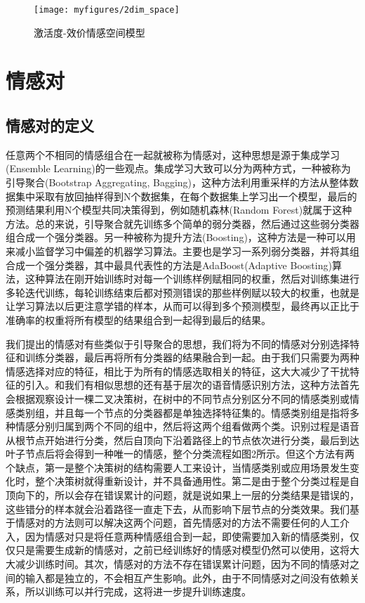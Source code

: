 \begin{figure}[H] %
    \centering
    \texttt{[image: myfigures/2dim\_space]}
    \caption{激活度-效价情感空间模型}
    \label{fig:xfig1}
\end{figure}

\section{情感对}
\label{sec:emo_pair}

\subsection{情感对的定义}
\label{ssec:emo_pair_def}
任意两个不相同的情感组合在一起就被称为情感对，这种思想是源于集成学习(Ensemble Learning)的一些观点。集成学习大致可以分为两种方式，一种被称为引导聚合(Bootstrap Aggregating, Bagging)，这种方法利用重采样的方法从整体数据集中采取有放回抽样得到N个数据集，在每个数据集上学习出一个模型，最后的预测结果利用N个模型共同决策得到，例如随机森林(Random Forest)就属于这种方法。总的来说，引导聚合就先训练多个简单的弱分类器，然后通过这些弱分类器组合成一个强分类器。另一种被称为提升方法(Boosting)，这种方法是一种可以用来减小监督学习中偏差的机器学习算法。主要也是学习一系列弱分类器，并将其组合成一个强分类器，其中最具代表性的方法是AdaBoost(Adaptive Boosting)算法，这种算法在刚开始训练时对每一个训练样例赋相同的权重，然后对训练集进行多轮迭代训练，每轮训练结束后都对预测错误的那些样例赋以较大的权重，也就是让学习算法以后更注意学错的样本，从而可以得到多个预测模型，最终再以正比于准确率的权重将所有模型的结果组合到一起得到最后的结果。

我们提出的情感对有些类似于引导聚合的思想，我们将为不同的情感对分别选择特征和训练分类器，最后再将所有分类器的结果融合到一起。由于我们只需要为两种情感选择对应的特征，相比于为所有的情感选取相关的特征，这大大减少了干扰特征的引入。和我们有相似思想的还有基于层次的语音情感识别方法，这种方法首先会根据观察设计一棵二叉决策树，在树中的不同节点分别区分不同的情感类别或情感类别组，并且每一个节点的分类器都是单独选择特征集的。情感类别组是指将多种情感分别归属到两个不同的组中，然后将这两个组看做两个类。识别过程是语音从根节点开始进行分类，然后自顶向下沿着路径上的节点依次进行分类，最后到达叶子节点后将会得到一种唯一的情感，整个分类流程如图2所示。但这个方法有两个缺点，第一是整个决策树的结构需要人工来设计，当情感类别或应用场景发生变化时，整个决策树就得重新设计，并不具备通用性。第二是由于整个分类过程是自顶向下的，所以会存在错误累计的问题，就是说如果上一层的分类结果是错误的，这些错分的样本就会沿着路径一直走下去，从而影响下层节点的分类效果。我们基于情感对的方法则可以解决这两个问题，首先情感对的方法不需要任何的人工介入，因为情感对只是将任意两种情感组合到一起，即使需要加入新的情感类别，仅仅只是需要生成新的情感对，之前已经训练好的情感对模型仍然可以使用，这将大大减少训练时间。其次，情感对的方法不存在错误累计问题，因为不同的情感对之间的输入都是独立的，不会相互产生影响。此外，由于不同情感对之间没有依赖关系，所以训练可以并行完成，这将进一步提升训练速度。

